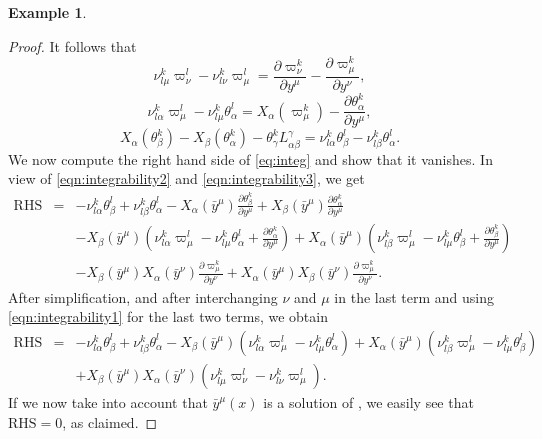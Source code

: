 \documentclass[11pt]{article}
\theoremstyle{plain}
\theoremstyle{definition}
\newtheorem{example}{Example}
\begin{document}
\begin{example}
\begin{proof}
It follows that
\begin{equation}\label{eqn:integrability1}
    \nu_{l\mu}^k \varpi_{\nu}^l-\nu_{l\nu}^k \varpi_{\mu}^l=\frac{\partial \varpi_{\nu}^k}{\partial y^{\mu}}-\frac{\partial \varpi_{\mu}^k}{\partial y^{\nu}},
\end{equation}
\begin{equation}\label{eqn:integrability2}
    \nu_{l\alpha}^k \varpi_{\mu}^l-\nu_{l\mu}^k \theta_{\alpha}^l= X_\alpha(\varpi_{\mu}^k)-\frac{\partial \theta_{\alpha}^k}{\partial y^{\mu}},
\end{equation}
\begin{equation}\label{eqn:integrability3}
    X_\alpha(\theta_{\beta}^k)-X_\beta(\theta_{\alpha}^k)-\theta_{\gamma}^k L_{\alpha \beta}^{\gamma}=\nu_{l\alpha}^k \theta_{\beta}^l-\nu_{l\beta}^k\theta_{\alpha}^l.
\end{equation}
We now compute the right hand side of \eqref{eq:integ} and show that it vanishes. In view of \eqref{eqn:integrability2} and \eqref{eqn:integrability3}, we get
\begin{eqnarray*}
\mbox{RHS} &=& -\nu_{l\alpha}^k \theta_{\beta}^l+\nu_{l\beta}^k\theta_{\alpha}^l 
- X_\alpha({\bar y}^\mu)\frac{\partial\theta^k_\beta}{\partial y^\mu}
+  X_\beta({\bar y}^\mu)\frac{\partial\theta^k_\alpha}{\partial y^\mu}
\\&&- X_\beta({\bar y}^\mu) \left( \nu_{l\alpha}^k \varpi_{\mu}^l-\nu_{l\mu}^k \theta_{\alpha}^l   + \frac{\partial \theta_{\alpha}^k}{\partial y^{\mu}} \right)
+ X_\alpha({\bar y}^\mu) \left( \nu_{l\beta}^k \varpi_{\mu}^l-\nu_{l\mu}^k \theta_{\beta}^l   + \frac{\partial \theta_{\beta}^k}{\partial y^{\mu}} \right)
\\&& - X_\beta(\bar{y}^\mu)X_\alpha({\bar y}^\nu)\frac{\partial\varpi^k_\mu}{\partial y^\nu} +  X_\alpha(\bar{y}^\mu)X_\beta({\bar y}^\nu)\frac{\partial\varpi^k_\mu}{\partial y^\nu}.
\end{eqnarray*}
After simplification, and after interchanging $\nu$ and $\mu$ in the last term and using \eqref{eqn:integrability1} for the last two terms, we obtain
\begin{eqnarray*}
\mbox{RHS} &=& -\nu_{l\alpha}^k \theta_{\beta}^l+\nu_{l\beta}^k\theta_{\alpha}^l 
- X_\beta({\bar y}^\mu) \left( \nu_{l\alpha}^k \varpi_{\mu}^l-\nu_{l\mu}^k \theta_{\alpha}^l    \right)
+ X_\alpha({\bar y}^\mu) \left( \nu_{l\beta}^k \varpi_{\mu}^l-\nu_{l\mu}^k \theta_{\beta}^l    \right)
\\&& + X_\beta(\bar{y}^\mu)X_\alpha({\bar y}^\nu)\left(\nu_{l\mu}^k \varpi_{\nu}^l-\nu_{l\nu}^k \varpi_{\mu}^l\right).
\end{eqnarray*}
If we now take into account that ${\bar y}^\mu(x)$ is a solution of , we easily see that 
$\mbox{RHS} =0$, as claimed.
\end{proof}

\end{example}
\end{document}
